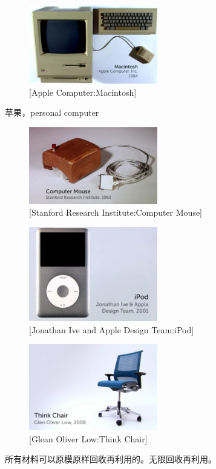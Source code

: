 \documentclass[UTF8]{../RepresentationUniverse}
\begin{document}
\begin{figure}[h]
    \centering
    \includegraphics[width=0.5\textwidth]{./src/figures/Macintosh_2023-04-09_21-53-44.png}
    \caption{[Apple Computer:Macintosh]}
    \label{figure:Macintosh}
\end{figure}
苹果，personal computer


\begin{figure}[h]
    \centering
    \includegraphics[width=0.5\textwidth]{./src/figures/Computer Mouse_2023-04-09_21-56-05.png}
    \caption{[Stanford Research Institute:Computer Mouse]}
    \label{figure:Computer Mouse}
\end{figure}


\begin{figure}[h]
    \centering
    \includegraphics[width=0.5\textwidth]{./src/figures/iPod_2023-04-09_21-59-02.png}
    \caption{[Jonathan Ive and Apple Design Team:iPod]}
    \label{figure:iPod}
\end{figure}


\begin{figure}[h]
    \centering
    \includegraphics[width=0.5\textwidth]{./src/figures/Think Chair_2023-04-09_22-02-24.png}
    \caption{[Glean Oliver Low:Think Chair]}
    \label{figure:Think Chair}
\end{figure}
所有材料可以原模原样回收再利用的。无限回收再利用。
\end{document}
